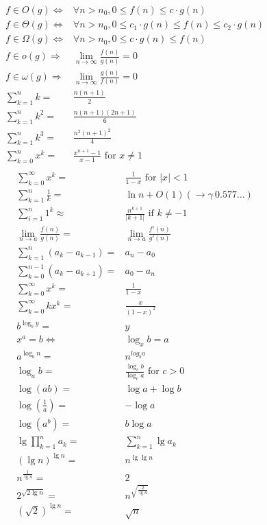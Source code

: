 \documentclass[10pt, a4paper,landscape]{article}
\begin{document}
\begin{multicols*}{4}
\begin{align*}
    f \in O(g) \Leftrightarrow& \forall n > n_0, 0 \leq f(n) \leq c \cdot g(n) \\
    f \in \Theta(g) \Leftrightarrow& \forall n > n_0, 0 \leq c_1 \cdot g(n) \leq f(n) \leq c_2 \cdot g(n) \\
    f \in \Omega(g) \Leftrightarrow& \forall n > n_0, 0 \leq c \cdot g(n) \leq f(n) \\
    f \in o(g) \Rightarrow& \lim_{n \rightarrow \infty} \frac {f(n)} {g(n)} = 0 \\
    f \in \omega(g) \Rightarrow& \lim_{n \rightarrow \infty} \frac {g(n)} {f(n)} = 0 \\
    \sum_{k=1}^{n} k =& \frac{n(n + 1)}{2}\\
    \sum_{k=1}^{n} k^2 =& \frac{n(n + 1)(2n + 1)}{6}\\
    \sum_{k=1}^{n} k^3 =& \frac{n^2 (n + 1)^2}{4}\\
    \sum_{k=0}^{n} x^k =& \frac{x^{n+1} - 1}{x - 1} \text{ for } x \neq 1\\
\end{align*}
\begin{align*}
    \sum_{k=0}^{\infty} x^k =& \frac{1}{1 - x} \text{ for } |x| < 1\\
    \sum_{k=1}^{n} \frac{1}{k} =& \ln n + O(1) (\rightarrow \gamma ~ 0.577 \ldots)\\
    \sum_{i=1}^{n} 1^k \approx& \frac{n^{k +1}}{|k + 1|} \text{ if } k \neq -1\\
    \lim_{n \rightarrow a} \frac{f(n)}{g(n)} =& \lim_{n \rightarrow a} \frac{f'(n)}{g'(n)}\\
    \sum_{k=1}^{n} (a_k - a_{k - 1}) =& a_n - a_0\\
    \sum_{k=0}^{n-1} (a_k- a_{k + 1}) =& a_0 - a_n\\
    \sum_{k=0}^{\infty} x^k =& \frac{1}{1 - x}\\
    \sum_{k=0}^{\infty} kx^k =& \frac{x}{(1 - x)^2}\\
    b^{\log_b y} =& y\\
    x^a = b \Leftrightarrow & \log_x b = a\\
    a^{\log_b n} =& n^{log_b a}\\
    \log_a b =& \frac{\log_c b}{\log_c a} \text{ for } c > 0\\
    \log(ab) =& \log a + \log b\\
    \log(\frac{1}{a}) =& -\log a\\
    \log(a^b) =& b \log a\\
    \lg \prod_{k = 1}^{n} a_k =& \sum_{k = 1}^{n} \lg a_k\\
    (\lg n)^{\lg n} =& n^{\lg \lg n}\\
    n^{\frac{1}{\lg n}} =& 2\\
    2^{\sqrt{2 \lg n}} =& n^{\sqrt{\frac{2}{\lg n}}}\\
    (\sqrt{2})^{\lg n} =& \sqrt{n}\\
\end{align*}


\end{multicols*}
\end{document}
